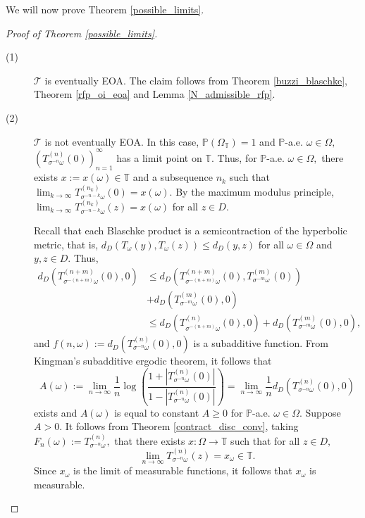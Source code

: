 \documentclass[12pt,reqno]{amsart}
\numberwithin{theorem}{section}
\begin{document}
We will now prove Theorem \ref{possible_limits}.
\begin{proof}[Proof of Theorem \ref{possible_limits}]



    \begin{description}
    \item[(1)]\label{case1} $\mathcal{T}$ is eventually EOA.
    The claim follows from Theorem \ref{buzzi_blaschke}, Theorem \ref{rfp_oi_eoa} and Lemma \ref{N_admissible_rfp}. 
    \item[(2)]$\mathcal{T}$ is not eventually EOA. In this case, $\mathbb{P}(\Omega_{\mathbb{T}})=1$ and $\mathbb{P}$-a.e. $\omega\in\Omega,$ $(T_{\sigma^{-n}\omega}^{(n)}(0))_{n=1}^{\infty}$ has a limit point on $\mathbb{T}.$ Thus, for $\mathbb{P}$-a.e. $\omega\in\Omega,$ there exists $x:=x(\omega)\in\mathbb{T}$ and a subsequence $n_k$ such that $\lim_{k\to\infty}T_{\sigma^{-n-k}\omega}^{(n_k)}(0)=x(\omega).$ By the maximum modulus principle, $\lim_{k\to\infty}T_{\sigma^{-n-k}\omega}^{(n_k)}(z)=x(\omega)$ for all $z\in D.$  
    
    Recall that each Blaschke product is a semicontraction of the hyperbolic metric, that is, $d_{D}(T_{\omega}(y),T_{\omega}(z))\le d_{D}(y,z)$ for all $\omega\in\Omega$ and $y,z\in D.$ Thus, \begin{align*}
        d_{D}(T_{\sigma^{-(n+m)}\omega}^{(n+m)}(0),0)&\le d_{D}(T_{\sigma^{-(n+m)}\omega}^{(n+m)}(0),T_{\sigma^{-m}\omega}^{(m)}(0))\\&+d_{D}(T_{\sigma^{-m}\omega}^{(m)}(0),0)\\&\le d_{D}(T_{\sigma^{-(n+m)}\omega}^{(n)}(0),0)+d_{D}(T_{\sigma^{-m}\omega}^{(m)}(0),0),
    \end{align*} and $f(n,\omega):=d_{D}(T_{\sigma^{-n}\omega}^{(n)}(0),0)$ is a subadditive function. From Kingman's subadditive ergodic theorem, it follows that $$A(\omega):=\lim_{n\to\infty}\frac{1}{n}\log\left(\frac{1+|T_{\sigma^{-n}\omega}^{(n)}(0)|}{1-|T_{\sigma^{-n}\omega}^{(n)}(0)|}\right)=\lim_{n\to\infty}\frac{1}{n}d_{D}(T_{\sigma^{-n}\omega}^{(n)}(0),0)$$ exists and  $A(\omega)$ is equal to constant $A\ge0$ for $\mathbb{P}$-a.e. $\omega\in\Omega.$ Suppose $A>0.$ It follows from Theorem \ref{contract_disc_conv}, taking $F_{n}(\omega):=T_{\sigma^{-n}\omega}^{(n)},$ that there exists $x:\Omega\to\mathbb{T}$ such that for all $z\in D,$ $$\lim_{n\to\infty}T_{\sigma^{-n}\omega}^{(n)}(z)=x_{\omega}\in\mathbb{T}.$$ Since $x_{\omega}$ is the limit of measurable functions, it follows that $x_{\omega}$ is measurable.
    

\end{description}
\end{proof}
\end{document}
